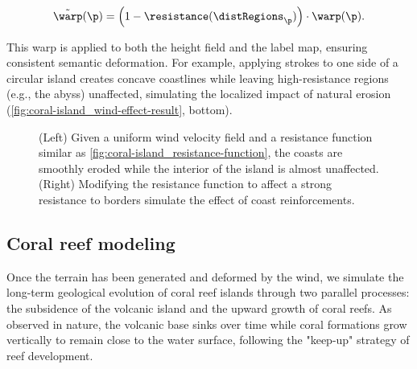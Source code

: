 \begin{align}
    \Tilde{\warp}(\p) = \left(1 - \resistance(\distRegions_\p) \right) \cdot \warp(\p).
\end{align}

This warp is applied to both the height field and the label map, ensuring consistent semantic deformation. For example, applying strokes to one side of a circular island creates concave coastlines while leaving high-resistance regions (e.g., the abyss) unaffected, simulating the localized impact of natural erosion (\cref{fig:coral-island_wind-effect-result}, bottom).

\begin{figure}
    \caption{(Left) Given a uniform wind velocity field and a resistance function similar as \cref{fig:coral-island_resistance-function}, the coasts are smoothly eroded while the interior of the island is almost unaffected. (Right) Modifying the resistance function to affect a strong resistance to borders simulate the effect of coast reinforcements.}
    \label{fig:coral-island_resistance-result}
\end{figure}




\subsection{Coral reef modeling}
\label{sec:coral-island_coral-reef}

Once the terrain has been generated and deformed by the wind, we simulate the long-term geological evolution of coral reef islands through two parallel processes: the subsidence of the volcanic island and the upward growth of coral reefs. As observed in nature, the volcanic base sinks over time while coral formations grow vertically to remain close to the water surface, following the "keep-up" strategy of reef development.

